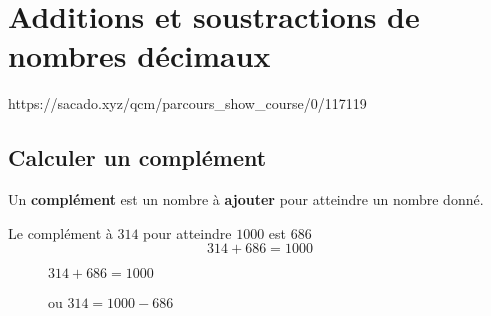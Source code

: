 \chapter{Additions et soustractions de nombres décimaux}
{https://sacado.xyz/qcm/parcours_show_course/0/117119}

\begin{pageCours} 

\section{Calculer un complément}

\begin{minipage}{0.6\linewidth}
\begin{Def}
Un \textbf{complément} est un nombre à \textbf{ajouter} pour atteindre un nombre donné.
\end{Def}

\begin{Ex}
Le complément à $314$ pour atteindre $1000$ est $686$
\[314+686=1000\]
\begin{description}
\item[]  $314 + 686 = 1000$
\item[] ou  $314 = 1000 - 686$
\end{description}
\end{Ex}

\end{minipage}
\begin{minipage}{0.4\linewidth}


\end{minipage}
\end{pageCours}
